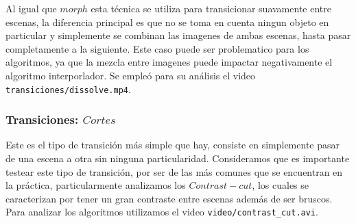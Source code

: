 Al igual que $morph$ esta técnica se utiliza para transicionar suavamente entre escenas, la diferencia principal es que no se toma en cuenta ningun objeto en particular y simplemente se combinan las imagenes de ambas escenas, hasta pasar completamente a la siguiente. Este caso puede ser problematico para los algoritmos, ya que la mezcla entre imagenes puede impactar negativamente el algoritmo interporlador. Se empleó para su análisis el video \texttt{transiciones/dissolve.mp4}.

\subsubsection{Transiciones: $Cortes$}

Este es el tipo de transición más simple que hay, consiste en simplemente pasar de una escena a otra sin ninguna particularidad. Consideramos que es importante testear este tipo de transición, por ser de las más comunes que se encuentran en la práctica, particularmente analizamos los $Contrast-cut$, los cuales se caracterizan por tener un gran contraste entre escenas además de ser bruscos. Para analizar los algoritmos utilizamos el video \texttt{video/contrast\_cut.avi}.